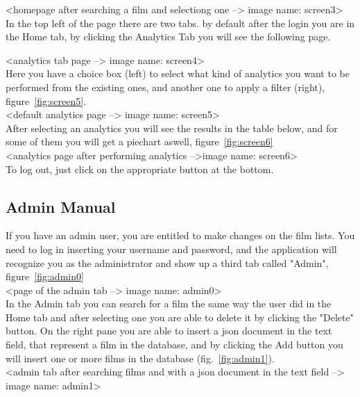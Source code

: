 \documentclass[a4paper, oneside]{article}
\begin{document}
<homepage after searching a film and selectiong one --> image name: screen3>\\

In the top left of the page there are two tabs. by default after the login you are in the Home tab, by clicking the Analytics Tab you will see the following page.

<analytics tab page --> image name: screen4>\\

Here you have a choice box (left) to select what kind of analytics you want to be performed from the existing ones, and another one to apply a filter (right), figure~\ref{fig:screen5}. \\

<default analytics page --> image name: screen5>\\

After selecting an analytics you will see the results in the table below, and for some of them you will get a piechart aswell, figure~\ref{fig:screen6}\\

<analytics page after performing analytics -->image name: screen6>\\

To log out, just click on the appropriate button at the bottom.

\clearpage
\subsection{Admin Manual}
If you have an admin user, you are entitled to make changes on the film lists. You need to log in inserting your username and password, and the application will recognize you as the administrator and show up a third tab called "Admin", figure~\ref{fig:admin0}\\

<page of the admin tab --> image name: admin0>\\

In the Admin tab you can search for a film the same way the user did in the Home tab and after selecting one you are able to delete it by clicking the "Delete" button. On the right pane you are able to insert a json document in the text field, that represent a film in the database, and by clicking the Add button you will insert one or more films in the database (fig.~\ref{fig:admin1}).\\ 

<admin tab after searching films and with a json document in the text field --> image name: admin1>

\fi
\end{document}
